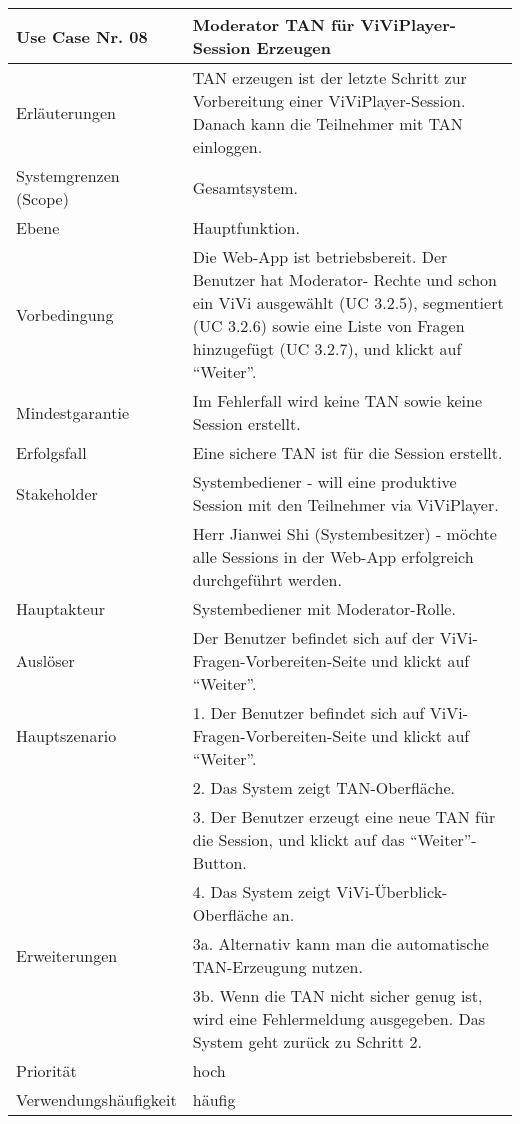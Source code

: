 \begin{tabularx}{\linewidth}{|l|X|}
	\hline
	Use Case Nr. 08			& \textbf{Moderator TAN für ViViPlayer-Session Erzeugen} \\ \hline
	Erläuterungen			& TAN erzeugen ist der letzte Schritt zur Vorbereitung einer 
							  ViViPlayer-Session. Danach kann die Teilnehmer mit TAN einloggen. \\ \hline
	Systemgrenzen (Scope)	& Gesamtsystem. \\ \hline
	Ebene					& Hauptfunktion. \\ \hline
	Vorbedingung			& Die Web-App ist betriebsbereit. Der Benutzer hat Moderator-
							  Rechte und schon ein ViVi ausgewählt (UC 3.2.5), segmentiert (UC 3.2.6) sowie eine Liste von Fragen hinzugefügt (UC 3.2.7), und klickt auf ``Weiter''. \\ \hline
	Mindestgarantie			& Im Fehlerfall wird keine TAN sowie keine Session erstellt.
							  \\ \hline
	Erfolgsfall 			& Eine sichere TAN ist für die Session erstellt. \\ \hline
	Stakeholder				& Systembediener - will eine produktive Session mit den Teilnehmer 
							  via ViViPlayer. \\
							& Herr Jianwei Shi (Systembesitzer) - möchte alle Sessions in der 
							  Web-App erfolgreich durchgeführt werden. \\ \hline
	Hauptakteur				& Systembediener mit Moderator-Rolle. \\ \hline
	Auslöser				& Der Benutzer befindet sich auf der ViVi-Fragen-Vorbereiten-Seite 
	                          und klickt auf ``Weiter''. \\ \hline	
	Hauptszenario			& 1. Der Benutzer befindet sich auf ViVi-Fragen-Vorbereiten-Seite
							  und klickt auf ``Weiter''. \\
							& 2. Das System zeigt TAN-Oberfläche. \\
							& 3. Der Benutzer erzeugt eine neue TAN für die Session, und klickt 
							  auf das ``Weiter''-Button. \\ 
							& 4. Das System zeigt ViVi-Überblick-Oberfläche an. \\ \hline
	Erweiterungen			& 3a. Alternativ kann man die automatische TAN-Erzeugung nutzen. 
							  \\
							& 3b. Wenn die TAN nicht sicher genug ist, wird eine Fehlermeldung 
							  ausgegeben. Das System geht zurück zu Schritt 2. \\ \hline
	Priorität				& hoch \\ \hline
	Verwendungshäufigkeit	& häufig \\ \hline
\end{tabularx}